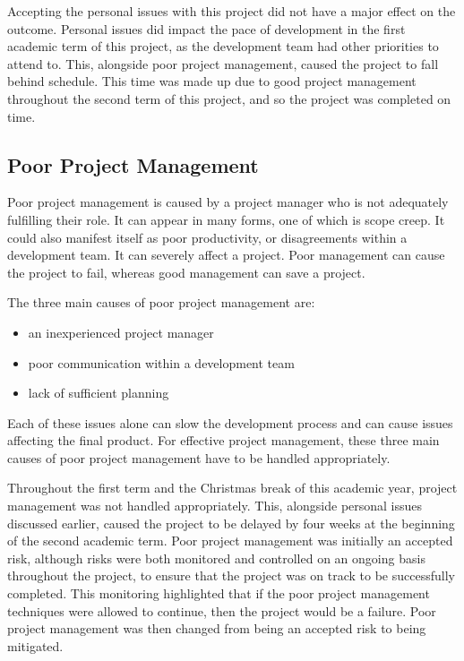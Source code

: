 \documentclass{article}
\begin{document}
Accepting the personal issues with this project did not have a major effect on the outcome. Personal issues did impact the pace of development in the first academic term of this project, as the development team had other priorities to attend to. This, alongside poor project management, caused the project to fall behind schedule. This time was made up due to good project management throughout the second term of this project, and so the project was completed on time. \par

\subsection{Poor Project Management}

Poor project management is caused by a project manager who is not adequately fulfilling their role. It can appear in many forms, one of which is scope creep. It could also manifest itself as poor productivity, or disagreements within a development team. It can severely affect a project. Poor management can cause the project to fail, whereas good management can save a project. \par

The three main causes of poor project management are:

\begin{itemize}
	\item an inexperienced project manager
	\item poor communication within a development team
	\item lack of sufficient planning
\end{itemize}

Each of these issues alone can slow the development process and can cause issues affecting the final product. For effective project management, these three main causes of poor project management have to be handled appropriately. \par

Throughout the first term and the Christmas break of this academic year, project management was not handled appropriately. This, alongside personal issues discussed earlier, caused the project to be delayed by four weeks at the beginning of the second academic term. Poor project management was initially an accepted risk, although risks were both monitored and controlled on an ongoing basis throughout the project, to ensure that the project was on track to be successfully completed. This monitoring highlighted that if the poor project management techniques were allowed to continue, then the project would be a failure. Poor project management was then changed from being an accepted risk to being mitigated. \par
\end{document}
